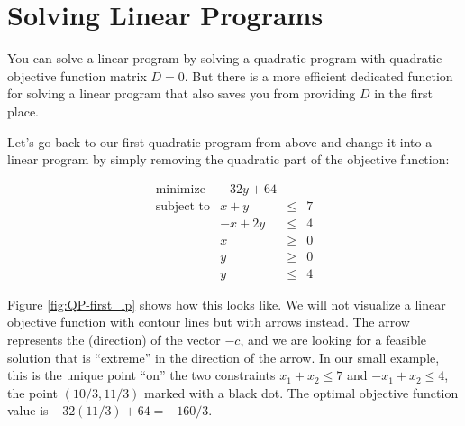 \section{Solving Linear Programs}\label{sec:QP-lp}
You can solve a linear program by solving a quadratic program with
quadratic objective function matrix $D=0$. But there is a more efficient
dedicated function for solving a linear program that also saves you
from providing $D$ in the first place. 

Let's go back to our first quadratic program from above and change it 
into a linear program by simply removing the quadratic part of the
objective function:

\[
\begin{array}{lrcl}
\mbox{minimize}       & - 32y + 64 \\
\mbox{subject to}     & x + y &\leq& 7 \\
                      & -x + 2y &\leq& 4 \\
                      & x &\geq& 0 \\
                      & y &\geq& 0 \\
                      & y &\leq& 4
\end{array}
\] 

Figure \ref{fig:QP-first_lp} shows how this looks like. We will not
visualize a linear objective function with contour lines but with
arrows instead. The arrow represents the (direction) of the vector $-c$,
and we are looking for a feasible solution that is ``extreme'' in the direction
of the arrow. In our small example, this is the unique point ``on'' the
two constraints $x_1+x_2\leq 7$ and $-x_1+x_2\leq 4$, the point
$(10/3,11/3)$ marked with a black dot. The optimal objective function
value is $-32(11/3)+64=-160/3$.

